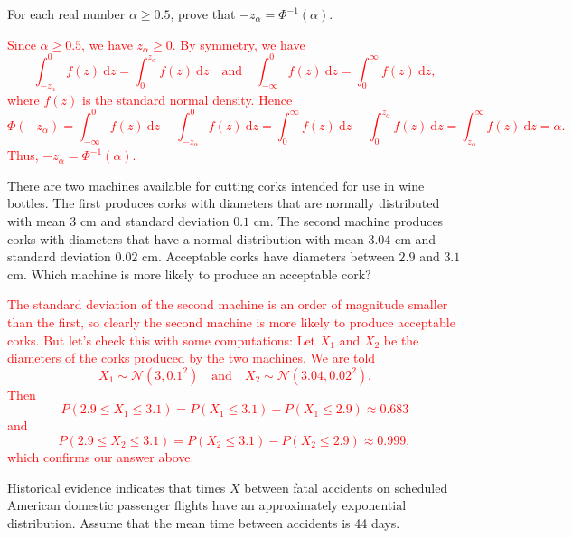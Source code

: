 \documentclass[12pt,reqno]{amsart}
\begin{document}
\bigskip
\prob For each real number $\alpha\geq 0.5$, prove that $-z_\alpha = \Phi^{-1}(\alpha)$.

\bigskip
\textcolor{red}{Since $\alpha\geq 0.5$, we have $z_\alpha \geq 0$. By symmetry, we have
	\[\int_{-z_\alpha}^0 f(z) \ \text{d} z = \int_0^{z_\alpha} f(z) \ \text{d} z \quad \text{and} \quad \int_{-\infty}^0 f(z) \ \text{d}z =  \int_0^\infty f(z) \ \text{d} z,
	\]
where $f(z)$ is the standard normal density. Hence
	\[\Phi(-z_\alpha) = \int_{-\infty}^0 f(z) \ \text{d}z - \int_{-z_\alpha}^0 f(z) \ \text{d}z = \int_0^\infty f(z) \ \text{d} z - \int_0^{z_\alpha} f(z) \ \text{d} z = \int_{z_\alpha}^\infty f(z) \ \text{d}z = \alpha.
	\]
Thus, $-z_\alpha = \Phi^{-1}(\alpha)$.}










\bigskip
\prob There are two machines available for cutting corks intended for use in wine bottles. The first produces corks with diameters that are normally distributed with mean $3$ cm and standard deviation $0.1$ cm. The second machine produces corks with diameters that have a normal distribution with mean $3.04$ cm and standard deviation $0.02$ cm. Acceptable corks have diameters between $2.9$ and $3.1$ cm. Which machine is more likely to produce an acceptable cork?

\bigskip
\textcolor{red}{The standard deviation of the second machine is an order of magnitude smaller than the first, so clearly the second machine is more likely to produce acceptable corks. But let's check this with some computations: Let $X_1$ and $X_2$ be the diameters of the corks produced by the two machines. We are told
	\[X_1 \sim \mathcal{N}(3, 0.1^2) \quad \text{and} \quad X_2 \sim \mathcal{N}(3.04,0.02^2).
	\]
Then
	\[P(2.9 \leq X_1 \leq 3.1) = P(X_1 \leq 3.1) - P(X_1 \leq 2.9) \approx 0.683
	\]
and
	\[P(2.9 \leq X_2 \leq 3.1) = P(X_2 \leq 3.1) - P(X_2 \leq 2.9) \approx 0.999,
	\]
which confirms our answer above.}










\bigskip
\prob Historical evidence indicates that times $X$ between fatal accidents on scheduled American domestic passenger flights have an approximately exponential distribution. Assume that the mean time between accidents is 44 days.
\end{document}
